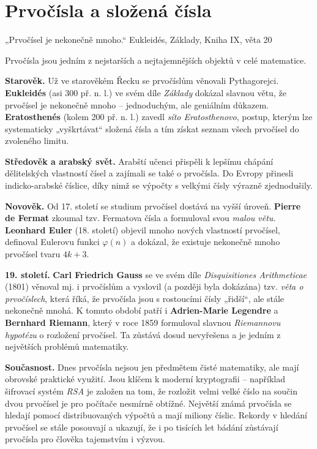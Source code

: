 \documentclass[12pt,a4paper]{article}
\begin{document}
\newpage
\section{Prvočísla a složená čísla}


\begin{quotebox}
{„Prvočísel je nekonečně mnoho.“}
{Eukleidés, Základy, Kniha IX, věta 20}
\end{quotebox}

\begin{historicalbox}
Prvočísla jsou jedním z nejstarších a nejtajemnějších objektů v celé matematice.  

\textbf{Starověk.}  
Už ve starověkém Řecku se prvočíslům věnovali Pythagorejci. \textbf{Eukleidés} (asi 300 př. n. l.) ve svém díle \emph{Základy} dokázal slavnou větu, že prvočísel je nekonečně mnoho – jednoduchým, ale geniálním důkazem.  
\textbf{Eratosthenés} (kolem 200 př. n. l.) zavedl \emph{síto Eratosthenovo}, postup, kterým lze systematicky „vyškrtávat“ složená čísla a tím získat seznam všech prvočísel do zvoleného limitu.  

\textbf{Středověk a arabský svět.}  
Arabští učenci přispěli k lepšímu chápání dělitelských vlastností čísel a zajímali se také o prvočísla. Do Evropy přinesli indicko-arabské číslice, díky nimž se výpočty s velkými čísly výrazně zjednodušily.  

\textbf{Novověk.}  
Od 17. století se studium prvočísel dostává na vyšší úroveň. \textbf{Pierre de Fermat} zkoumal tzv. Fermatova čísla a formuloval svou \emph{malou větu}.  
\textbf{Leonhard Euler} (18. století) objevil mnoho nových vlastností prvočísel, definoval Eulerovu funkci $\varphi(n)$ a dokázal, že existuje nekonečně mnoho prvočísel tvaru $4k+3$.  

\textbf{19. století.}  
\textbf{Carl Friedrich Gauss} se ve svém díle \emph{Disquisitiones Arithmeticae} (1801) věnoval mj. i prvočíslům a vyslovil (a později byla dokázána) tzv. \emph{věta o prvočíslech}, která říká, že prvočísla jsou s rostoucími čísly „řidší“, ale stále nekonečně mnohá.  
K tomuto období patří i \textbf{Adrien-Marie Legendre} a \textbf{Bernhard Riemann}, který v roce 1859 formuloval slavnou \emph{Riemannovu hypotézu} o rozložení prvočísel. Ta zůstává dosud nevyřešena a je jedním z největších problémů matematiky.  

\textbf{Současnost.}  
Dnes prvočísla nejsou jen předmětem čisté matematiky, ale mají obrovské praktické využití. Jsou klíčem k moderní kryptografii – například šifrovací systém \emph{RSA} je založen na tom, že rozložit velmi velké číslo na součin dvou prvočísel je pro počítače nesmírně obtížné.  
Největší známá prvočísla se hledají pomocí distribuovaných výpočtů a mají miliony číslic. Rekordy v hledání prvočísel se stále posouvají a ukazují, že i po tisících let bádání zůstávají prvočísla pro člověka tajemstvím i výzvou.  
\end{historicalbox}
\end{document}
